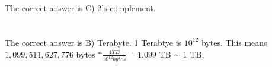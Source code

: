 \documentclass[a4paper,11pt]{article}
\begin{document}

\section{}
The correct answer is C) 2's complement.  


\section{}


\section{}

The correct answer is B) Terabyte.  1 Terabtye is $10^{12}$ bytes.  This means $1,099,511,627,776$ bytes $* \frac{1 TB}{10^{12}  bytes} = 1.099$ TB $\sim$ 1 TB.

\end{document}

